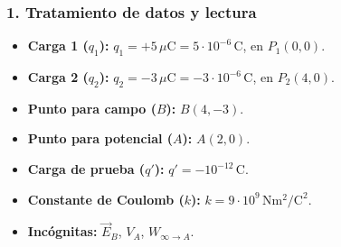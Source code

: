\subsubsection*{1. Tratamiento de datos y lectura}
\begin{itemize}
    \item \textbf{Carga 1 ($q_1$):} $q_1 = +5\,\mu\text{C} = 5 \cdot 10^{-6}\,\text{C}$, en $P_1(0,0)$.
    \item \textbf{Carga 2 ($q_2$):} $q_2 = -3\,\mu\text{C} = -3 \cdot 10^{-6}\,\text{C}$, en $P_2(4,0)$.
    \item \textbf{Punto para campo ($B$):} $B(4,-3)$.
    \item \textbf{Punto para potencial ($A$):} $A(2,0)$.
    \item \textbf{Carga de prueba ($q'$):} $q' = -10^{-12}\,\text{C}$.
    \item \textbf{Constante de Coulomb ($k$):} $k = 9 \cdot 10^9 \, \text{N}\text{m}^2/\text{C}^2$.
    \item \textbf{Incógnitas:} $\vec{E}_B$, $V_A$, $W_{\infty \to A}$.
\end{itemize}

